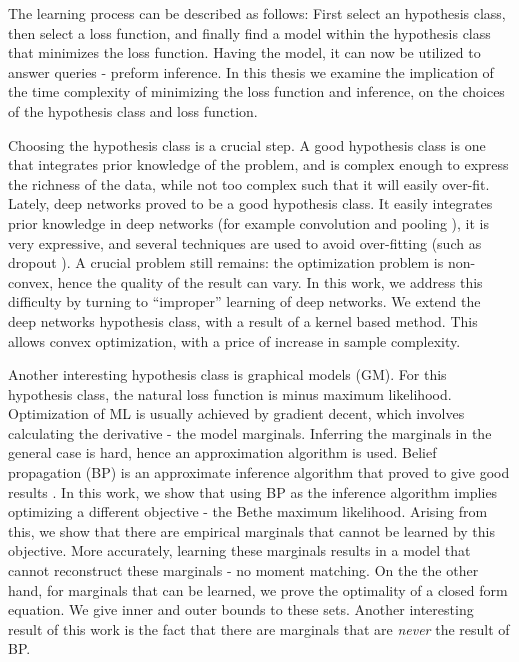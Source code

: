 The learning process can be described as follows: First select an hypothesis class, then select a loss function,  and finally find a model within the hypothesis class that minimizes the loss function.
Having the model, it can now be utilized to answer queries - preform inference. 
In this thesis we examine the implication of the time complexity of minimizing the loss function and inference, on the choices of the hypothesis class and loss function.

Choosing the hypothesis class is a crucial step. A good hypothesis class is one that integrates prior knowledge of the problem, and is complex enough to express the richness of the data, while not too complex such that it will easily over-fit.
Lately, deep networks proved to be a good hypothesis class.
It easily integrates prior knowledge in deep networks  (for example convolution and pooling \cite{lecun1995convolutional}), it is very expressive, and several techniques are used to avoid over-fitting (such as dropout \cite{srivastava2014dropout}).
A crucial problem still remains: the optimization problem is non-convex, hence the quality of the result can vary.
In this work, we address this difficulty by turning to ``improper'' learning of deep networks.
We extend the deep networks hypothesis class, with a result of a kernel based method.
This allows convex optimization, with a price of increase in sample complexity.

Another interesting hypothesis class is graphical models (GM).
For this hypothesis class, the natural loss function is minus maximum likelihood.
Optimization of ML is usually achieved by gradient decent, which involves calculating the derivative - the model marginals.
Inferring the marginals in the general case is hard, hence an approximation algorithm is used.
Belief propagation (BP) is an approximate inference algorithm that proved to give good results \cite{murphy1999loopy}.
In this work, we show that using BP as the inference algorithm implies optimizing a different objective - the Bethe maximum likelihood.
Arising from this, we show that there are empirical marginals that cannot be learned by this objective.
More accurately, learning these marginals results in a model that cannot reconstruct these marginals - no moment matching.
On the the other hand, for marginals that can be learned, we prove the optimality of a closed form equation.
We give inner and outer bounds to these sets.
Another interesting result of this work is the fact that there are marginals that are \textit{never} the result of BP.

